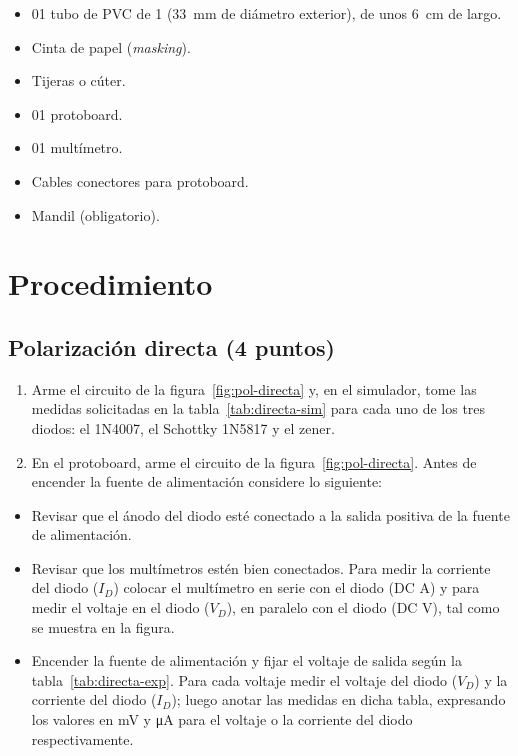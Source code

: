 \documentclass[11pt,a4paper]{article}
\newcommand{\puntos}[1]{\normalfont\normalsize\textmd{(#1 puntos)}}
\begin{document}
\begin{itemize}
          (\qty{0.51}{\milli\metre} de diámetro).
    \item 01 tubo de PVC de 1\textquotedbl{} (\qty{33}{\milli\metre} de diámetro
          exterior), de unos \qty{6}{\centi\metre} de largo.
    \item Cinta de papel (\emph{masking}).
    \item Tijeras o cúter.
    \item 01 protoboard.
    \item 01 multímetro.
    \item Cables conectores para protoboard.
    \item Mandil (obligatorio).
\end{itemize}

\FloatBarrier
\section{Procedimiento}
\subsection{Polarización directa \puntos{4}}

\begin{enumerate}[label=\textbf{\alph*)}, leftmargin=*, labelsep=0.6em]
\item Arme el circuito de la figura~\ref{fig:pol-directa} y, en el simulador, tome las
medidas solicitadas en la tabla~\ref{tab:directa-sim} para cada uno de los tres
diodos: el 1N4007, el Schottky 1N5817 y el zener.

\item En el protoboard, arme el circuito de la figura~\ref{fig:pol-directa}. Antes de encender la
fuente de alimentación considere lo siguiente:
\end{enumerate}

\begin{itemize}
    \item Revisar que el ánodo del diodo esté conectado a la salida positiva de la fuente de
          alimentación.
    \item Revisar que los multímetros estén bien conectados. Para medir la corriente del diodo
          ($I_D$) colocar el multímetro en serie con el diodo (DC A) y para medir el voltaje en
          el diodo ($V_D$), en paralelo con el diodo (DC V), tal como se muestra en la figura.
    \item Encender la fuente de alimentación y fijar el voltaje de salida según la
          tabla~\ref{tab:directa-exp}. Para cada voltaje medir el voltaje del diodo ($V_D$) y la
          corriente del diodo ($I_D$); luego anotar las medidas en dicha tabla, expresando los
          valores en \unit{\milli\volt} y \unit{\micro\ampere} para el voltaje o la corriente del
          diodo respectivamente.
\end{itemize}
\end{document}
